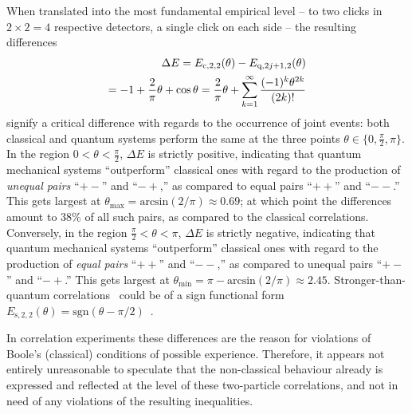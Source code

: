 When translated into the most fundamental empirical level
-- to two clicks in $2\times 2 =4$ respective detectors, a single click on each side -- the resulting differences
\begin{equation}
\begin{split}
\Delta E = E_{\text{c},2,2}(\theta ) - E_{\text{q},2j+1,2}(\theta ) \\
= -1 + {2 \over \pi}\theta + \cos \theta
= {2 \over \pi}\theta + \sum_{k=1}^\infty \frac{(-1)^k \theta^{2k}}{(2k)!}
\label{2017-b-ch-diffev}
\end{split}
\end{equation}
signify a critical difference
with regards to the occurrence of joint events:
both classical and quantum systems perform the same at the three points
$\theta \in \{0, \frac{\pi}{2},\pi\}$.
In the region
$0 < \theta <\frac{\pi}{2}$,
$\Delta E $ is strictly positive, indicating that quantum mechanical systems ``outperform''
classical ones with regard to the production of {\em unequal pairs} ``$+-$''  and ``$-+$,''
as compared to equal pairs  ``$++$''  and ``$--$.''
This gets largest at $\theta_{\text{max}}=\text{arcsin}({2}/{\pi}) \approx 0.69$;
at which point the differences amount to 38\%
of all such pairs, as compared to the classical correlations.
Conversely,
in the region
$ \frac{\pi}{2} < \theta <\pi $,
$\Delta E $ is strictly negative, indicating that quantum mechanical systems ``outperform''
classical ones with regard to the production of {\em  equal pairs} ``$++$''  and ``$--$,''
as compared to unequal pairs   ``$+-$''  and ``$-+$.''
This gets largest at $\theta_{\text{min}}= \pi -\text{arcsin}({2}/{\pi}) \approx 2.45$.
Stronger-than-quantum correlations~\cite{popescu-97,popescu-2014} could be of a sign functional form
$
E_{\text{s},2,2}(\theta )= \text{sgn} (\theta-\pi /2 )
$~\cite{svozil-krenn}.

In correlation experiments these differences are the reason for violations of Boole's
(classical) conditions of possible experience.
Therefore, it appears not entirely unreasonable to speculate that
the non-classical behaviour already is expressed and reflected at the level of these two-particle correlations,
and not in need of any violations of the resulting inequalities.


